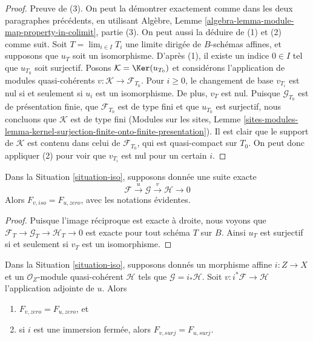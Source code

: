 \begin{proof}
\medskip\noindent
Preuve de (3). On peut la démontrer exactement comme dans les
deux paragraphes précédents, en utilisant
Algèbre, Lemme \ref{algebra-lemma-module-map-property-in-colimit}, partie (3).
On peut aussi la déduire de (1) et (2) comme suit.
Soit $T = \lim_{i \in I} T_i$ une limite dirigée de $B$-schémas affines,
et supposons que $u_T$ soit un isomorphisme. D'après (1), il existe
un indice $0 \in I$ tel que $u_{T_0}$ soit surjectif. Posons
$\mathcal{K} = \Ker(u_{T_0})$ et considérons l'application de modules quasi-cohérents
$v : \mathcal{K} \to \mathcal{F}_{T_0}$. Pour $i \geq 0$, le changement de
base $v_{T_i}$ est nul si et seulement si $u_i$ est un isomorphisme. De plus,
$v_T$ est nul. Puisque $\mathcal{G}_{T_0}$
est de présentation finie, que $\mathcal{F}_{T_0}$ est de type fini et que
$u_{T_0}$ est surjectif, nous concluons que $\mathcal{K}$ est de type fini
(Modules sur les sites, Lemme
\ref{sites-modules-lemma-kernel-surjection-finite-onto-finite-presentation}).
Il est clair que le support de $\mathcal{K}$ est contenu dans celui
de $\mathcal{F}_{T_0}$, qui est quasi-compact sur $T_0$.
On peut donc appliquer (2) pour voir que $v_{T_i}$ est nul pour un certain $i$.
\end{proof}

\begin{lemma}
\label{lemma-relate-zero-iso}
Dans la Situation \ref{situation-iso}, supposons donnée une suite exacte
$$
\mathcal{F} \xrightarrow{u} \mathcal{G} \xrightarrow{v} \mathcal{H} \to 0
$$
Alors $F_{v, iso} = F_{u, zero}$, avec les notations évidentes.
\end{lemma}

\begin{proof}
Puisque l'image réciproque est exacte à droite, nous voyons que
$\mathcal{F}_T \to \mathcal{G}_T \to \mathcal{H}_T \to 0$
est exacte pour tout schéma $T$ sur $B$. Ainsi $u_T$ est
surjectif si et seulement si $v_T$ est un isomorphisme.
\end{proof}

\begin{lemma}
\label{lemma-relate-zero-affine}
Dans la Situation \ref{situation-iso}, supposons donnés un morphisme affine
$i : Z \to X$ et un $\mathcal{O}_Z$-module quasi-cohérent $\mathcal{H}$
tels que $\mathcal{G} = i_*\mathcal{H}$. Soit
$v : i^*\mathcal{F} \to \mathcal{H}$ l'application adjointe de $u$.
Alors
\begin{enumerate}
\item $F_{v, zero} = F_{u, zero}$, et
\item si $i$ est une immersion fermée, alors $F_{v, surj} = F_{u, surj}$.
\end{enumerate}
\end{lemma}

